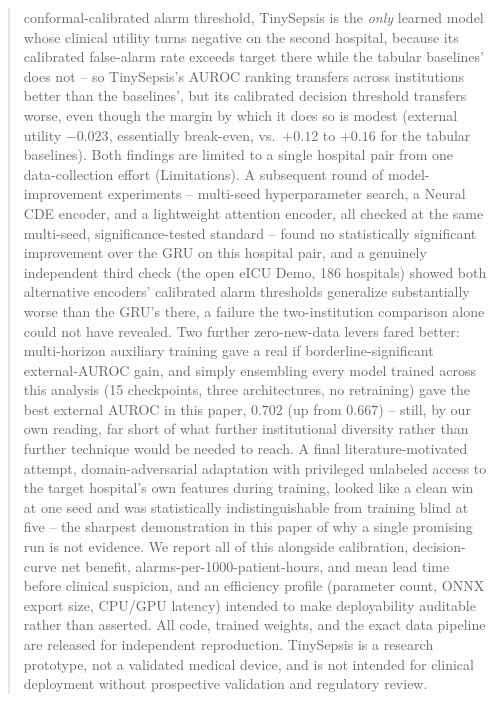 \documentclass[11pt]{article}
\begin{document}
\begin{abstract}
conformal-calibrated alarm threshold, TinySepsis is the \emph{only} learned model whose clinical utility turns negative on the second hospital, because its calibrated false-alarm rate exceeds target there while the tabular baselines' does not -- so TinySepsis's AUROC ranking transfers across institutions better than the baselines', but its calibrated decision threshold transfers worse, even though the margin by which it does so is modest (external utility $-0.023$, essentially break-even, vs.\ $+0.12$ to $+0.16$ for the tabular baselines). Both findings are limited to a single hospital pair from one data-collection effort (Limitations). A subsequent round of model-improvement experiments -- multi-seed hyperparameter search, a Neural CDE encoder, and a lightweight attention encoder, all checked at the same multi-seed, significance-tested standard -- found no statistically significant improvement over the GRU on this hospital pair, and a genuinely independent third check (the open eICU Demo, 186 hospitals) showed both alternative encoders' calibrated alarm thresholds generalize substantially worse than the GRU's there, a failure the two-institution comparison alone could not have revealed. Two further zero-new-data levers fared better: multi-horizon auxiliary training gave a real if borderline-significant external-AUROC gain, and simply ensembling every model trained across this analysis (15 checkpoints, three architectures, no retraining) gave the best external AUROC in this paper, $0.702$ (up from $0.667$) -- still, by our own reading, far short of what further institutional diversity rather than further technique would be needed to reach. A final literature-motivated attempt, domain-adversarial adaptation with privileged unlabeled access to the target hospital's own features during training, looked like a clean win at one seed and was statistically indistinguishable from training blind at five -- the sharpest demonstration in this paper of why a single promising run is not evidence. We report all of this alongside calibration, decision-curve net benefit, alarms-per-1000-patient-hours, and mean lead time before clinical suspicion, and an efficiency profile (parameter count, ONNX export size, CPU/GPU latency) intended to make deployability auditable rather than asserted. All code, trained weights, and the exact data pipeline are released for independent reproduction. TinySepsis is a research prototype, not a validated medical device, and is not intended for clinical deployment without prospective validation and regulatory review.
\end{abstract}
\end{document}
